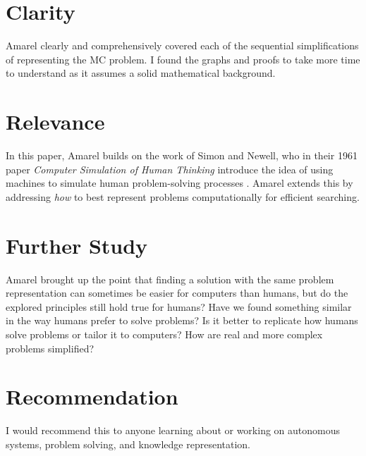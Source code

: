 \documentclass[12pt, letterpaper]{article}
\begin{document}

\section{Clarity}
\label{sec:clarity}
Amarel clearly and comprehensively covered each of the sequential simplifications of representing the MC problem. I found the graphs and proofs to take more time to understand as it assumes a solid mathematical background.

\section{Relevance}
\label{sec:relevance}
In this paper, Amarel builds on the work of Simon and Newell, who in their 1961 paper \emph{Computer Simulation of Human Thinking} introduce the idea of using machines to simulate human problem-solving processes \cite{doi:10.1126/science.134.3495.2011}. Amarel extends this by addressing \emph{how} to best represent problems computationally for efficient searching.

\section{Further Study}
\label{sec:further}
Amarel brought up the point that finding a solution with the same problem representation can sometimes be easier for computers than humans, but do the explored principles still hold true for humans? Have we found something similar in the way humans prefer to solve problems? Is it better to replicate how humans solve problems or tailor it to computers? How are real and more complex problems simplified?

\section{Recommendation}
\label{sec:rec}
I would recommend this to anyone learning about or working on autonomous systems, problem solving, and knowledge representation.
\end{document}
